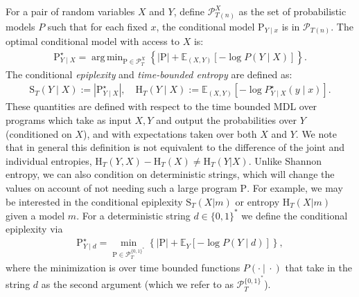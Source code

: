 \documentclass[twoside]{article}
\DeclareMathOperator*{\argmin}{arg\,min}
\newcommand{\rH}{\mathrm{H}}
\newcommand{\rS}{\mathrm{S}}
\begin{document}
\begin{definition}
    For a pair of random variables $X$ and $Y$, define $\mathcal{P}_{T(n)}^X$ as the set of probabilistic models $P$ such that for each fixed $x$, the conditional model $\mathrm{P}_{Y\mid x}$ is in $\mathcal{P}_{T(n)}$. The optimal conditional model with  access to $X$ is:
    \begin{align}
        \mathrm{P}^\star_{Y \mid X} = \argmin_{\mathrm{P} \in \mathcal{P}_T^X} \left\{|\mathrm{P}| + \mathbb{E}_{(X,Y)}\left[-\log P(Y \mid X)\right]\right\}.
    \end{align}
    The conditional \emph{epiplexity} and \emph{time-bounded entropy} are defined as:
    \begin{align}
        \rS_T(Y \mid X) := \left|\mathrm{P}^{\star}_{Y\mid X}\right|, \quad \mathrm{H}_T(Y
        \mid X) := \mathbb{E}_{(X, Y)}\left[-\log P^\star_{Y\mid X}(y\mid x)\right].
    \end{align}
    These quantities are defined with respect to the time bounded MDL over programs which take as input $X,Y$ and output the probabilities over $Y$ (conditioned on $X$), and with expectations taken over both $X$ and $Y$. We note that in general this definition is not equivalent to the difference of the joint and individual entropies, $\rH_T(Y,X)-\rH_T(X)\ne \rH_T(Y|X)$.   
    Unlike Shannon entropy, we can also condition on deterministic strings, which will change the values on account of not needing such a large program $\mathrm{P}$. For example, we may be interested in the conditional epiplexity $\rS_T(X|m)$ or entropy $\rH_T(X|m)$ given a model $m$.
    For a deterministic string $d \in \{0,1\}^*$ we define the conditional epiplexity via
    \begin{align}
        \mathrm{P}^\star_{Y \mid d} = \min_{\mathrm{P} \in \mathcal{P}_T^{\{0,1\}^*}} \left\{|\mathrm{P}| + \mathbb{E}_{Y}\left[-\log P(Y \mid d)\right]\right\},
    \end{align}
    where the minimization is over time bounded functions $P(\cdot \ | \ \cdot)$ that take in the string $d$ as the second argument (which we refer to as $\mathcal{P}_T^{\{0,1\}^*}$).
\end{definition}



%
%
%
%




%

%
%
%
%
%
%
%
%


%
%
\end{document}
